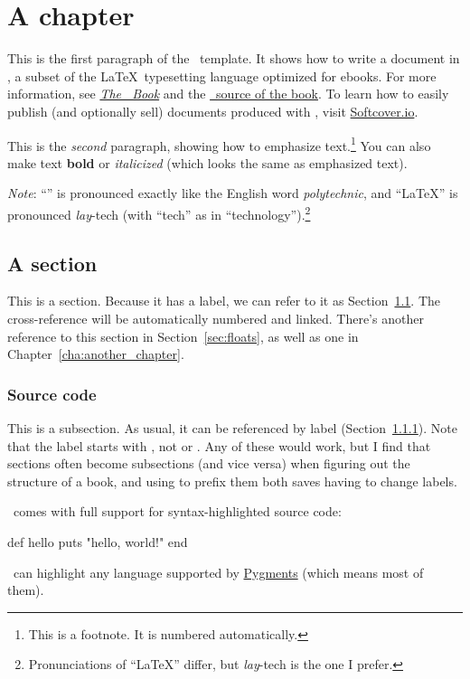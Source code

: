 \chapter{A chapter}
\label{cha:a_chapter}

This is the first paragraph of the \PolyTeXnic\ template. It shows how to write a document in \PolyTeX, a subset of the \LaTeX\ typesetting language optimized for ebooks. For more information, see \href{http://polytexnic.org/book}{\emph{The \PolyTeXnic\ Book}} and the \href{http://polytexnic.org/source}{\PolyTeX\ source of the book}. To learn how to easily publish (and optionally sell) documents produced with \PolyTeXnic, visit \href{http://softcover.io/}{Softcover.io}.

This is the \emph{second} paragraph, showing how to emphasize text.\footnote{This is a footnote. It is numbered automatically.} You can also make text \textbf{bold} or \textit{italicized} (which looks the same as emphasized text).

\emph{Note}: ``\PolyTeXnic'' is pronounced exactly like the English word \emph{polytechnic}, and ``\LaTeX'' is pronounced \emph{lay}-tech (with ``tech'' as in ``technology'').\footnote{Pronunciations of ``\LaTeX'' differ, but \emph{lay}-tech is the one I prefer.}

\section{A section}
\label{sec:a_section}

This is a section. Because it has a label, we can refer to it as Section~\ref{sec:a_section}. The cross-reference will be automatically numbered and linked. There's another reference to this section in Section~\ref{sec:floats}, as well as one in Chapter~\ref{cha:another_chapter}.

\subsection{Source code}
\label{sec:source_code}

This is a subsection. As usual, it can be referenced by label (Section~\ref{sec:source_code}). Note that the label starts with , not  or . Any of these would work, but I find that sections often become subsections (and vice versa) when figuring out the structure of a book, and using  to prefix them both saves having to change labels.

\PolyTeXnic\ comes with full support for syntax-highlighted source code:
\begin{code}
def hello
  puts "hello, world!"
end
\end{code}
\noindent \PolyTeXnic\ can highlight any language supported by \href{http://pygments.org/languages/}{Pygments} (which means most of them).

